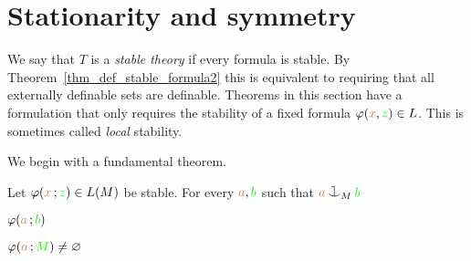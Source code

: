 \documentclass[creche.tex]{subfiles}
\begin{document}


\section{Stationarity and symmetry}

\def\ceq#1#2#3{\parbox{20ex}{$\displaystyle #1$}\medrel{#2}$\displaystyle  #3$}

We say that $T$ is a \emph{stable theory\/} if every formula is stable.
By Theorem~\ref{thm_def_stable_formula2} this is equivalent to requiring that all externally definable sets are definable.
Theorems in this section have a formulation that only requires the stability of a fixed formula $\varphi({\color{brown} x},{\color{green} z})\in L$.
This is sometimes called \textit{local\/} stability.

We begin with a fundamental theorem.

\begin{theorem}[ (Symmetry)]\label{thm_symmetry}
  Let $\varphi({\color{brown} x}\,;{\color{green} z})\in L(M)$ be stable.
  For every ${\color{brown} a},{\color{green} b}$ such that ${\mr a}\cnonfork_M{\gr b}$

  \ceq{\hfill\phi({\mr a}\,;{\gr b})}{\IMP}{\phi({\mr a}\,;{\gr M})\neq\0}
\end{theorem}
\end{document}
